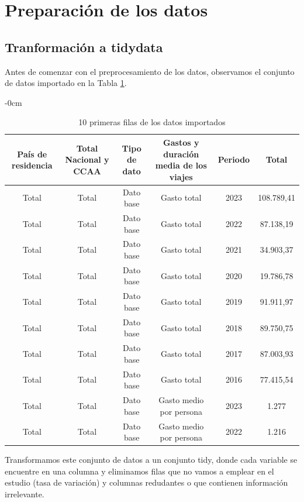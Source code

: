 \documentclass[data,article,submit,moreauthors,pdftex]{Definitions/mdpi}
\begin{document}
\section{Preparación de los datos}\label{preparaciuxf3n-de-los-datos}

\subsection{Tranformación a tidydata}\label{tranformaciuxf3n-a-tidydata}

Antes de comenzar con el preprocesamiento de los datos, observamos el
conjunto de datos importado en la Tabla \ref{tab:unnamed-chunk-4}.

\begin{table}[H]

\caption{\label{tab:unnamed-chunk-4}10 primeras filas de los datos importados}
\begin{adjustwidth}{-\extralength}{0cm}
             \small
\begin{tabular}[t]{cccccc}
\toprule
País de residencia & Total Nacional y CCAA & Tipo de dato & Gastos y duración media de los viajes & Periodo & Total\\
\midrule
Total & Total & Dato base & Gasto total & 2023 & 108.789,41\\
Total & Total & Dato base & Gasto total & 2022 & 87.138,19\\
Total & Total & Dato base & Gasto total & 2021 & 34.903,37\\
Total & Total & Dato base & Gasto total & 2020 & 19.786,78\\
Total & Total & Dato base & Gasto total & 2019 & 91.911,97\\
Total & Total & Dato base & Gasto total & 2018 & 89.750,75\\
Total & Total & Dato base & Gasto total & 2017 & 87.003,93\\
Total & Total & Dato base & Gasto total & 2016 & 77.415,54\\
Total & Total & Dato base & Gasto medio por persona & 2023 & 1.277\\
Total & Total & Dato base & Gasto medio por persona & 2022 & 1.216\\
\bottomrule
\end{tabular}
    \end{adjustwidth}
\end{table}

Transformamos este conjunto de datos a un conjunto tidy, donde cada
variable se encuentre en una columna y eliminamos filas que no vamos a
emplear en el estudio (tasa de variación) y columnas redudantes o que
contienen información irrelevante.
\end{document}
